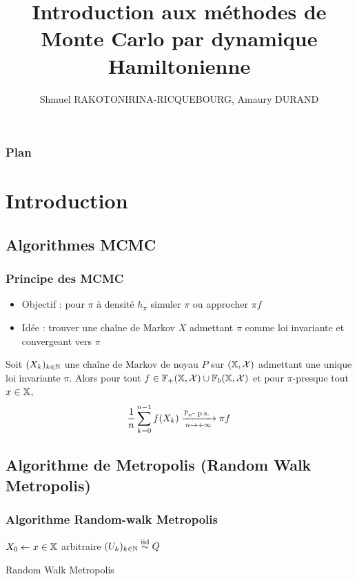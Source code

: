 \documentclass[10pt]{beamer}
\title[HMC]{Introduction aux méthodes de Monte Carlo par dynamique Hamiltonienne}
\author{Shmuel RAKOTONIRINA-RICQUEBOURG, Amaury DURAND}
\begin{document}
\begin{frame}
\titlepage
\end{frame}
\begin{frame}
  \frametitle{Plan}
  \tableofcontents[hideallsubsections]
\end{frame}

\section{Introduction}

\subsection{Algorithmes MCMC}

\begin{frame}
	\frametitle{Principe des MCMC}
	\begin{itemize}
		\item Objectif : pour $\pi$ à densité $h_\pi$ simuler $\pi$ ou approcher $\pi f$
		\item Idée : trouver une chaîne de Markov $X$ admettant $\pi$ comme loi invariante et convergeant vers $\pi$
	\end{itemize}
	\begin{Thm}\label{thm:ergodic}
		Soit $(X_k)_{k \in \mathbb{N}}$ une chaîne de Markov de noyau $P$ sur $(\mathbb{X}, \mathcal{X})$ admettant une unique loi invariante $\pi$. Alors pour tout $f \in \mathbb{F}_+(\mathbb{X}, \mathcal{X}) \cup \mathbb{F}_b(\mathbb{X}, \mathcal{X})$ et pour $\pi$-presque tout $x \in \mathbb{X}$,
		$$\frac{1}{n} \sum_{k=0}^{n-1} f(X_k) \xrightarrow[n \to +\infty]{\PP_x\text{-}\ps} \pi f$$
	\end{Thm}
\end{frame}

\subsection{Algorithme de Metropolis (Random Walk Metropolis)}

\begin{frame}
  \frametitle{Algorithme Random-walk Metropolis}
	\begin{center}
		\begin{algorithm}[H]
			$X_0 \leftarrow x \in \mathbb{X}$ arbitraire\;
			$(U_k)_{k \in \mathbb{N}} \stackrel{\rm iid}{\sim} Q$ \;
			\caption{Random Walk Metropolis}
			\label{algo:metropolis}
		\end{algorithm}
	\end{center}
\end{frame}
\end{document}
